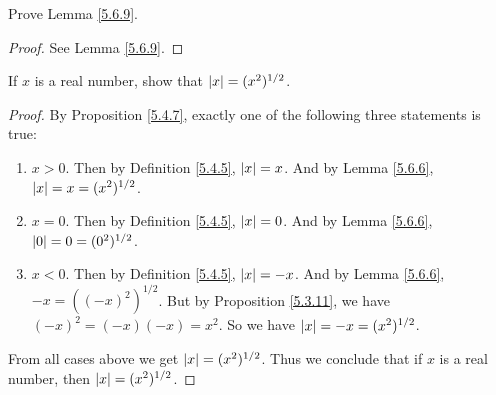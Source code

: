 \begin{exercise}\label{ex 5.6.2}
    Prove Lemma \ref{5.6.9}.
\end{exercise}

\begin{proof}
    See Lemma \ref{5.6.9}.
\end{proof}

\begin{exercise}\label{ex 5.6.3}
    If \(x\) is a real number, show that \(\abs*{x} = (x^2)^{1 / 2}\).
\end{exercise}

\begin{proof}
    By Proposition \ref{5.4.7}, exactly one of the following three statements is true:
    \begin{enumerate}
        \item \(x > 0\).
              Then by Definition \ref{5.4.5}, \(\abs*{x} = x\).
              And by Lemma \ref{5.6.6}, \(\abs*{x} = x = (x^2)^{1 / 2}\).
        \item \(x = 0\).
              Then by Definition \ref{5.4.5}, \(\abs*{x} = 0\).
              And by Lemma \ref{5.6.6}, \(\abs*{0} = 0 = (0^2)^{1 / 2}\).
        \item \(x < 0\).
              Then by Definition \ref{5.4.5}, \(\abs*{x} = -x\).
              And by Lemma \ref{5.6.6}, \(-x = ((-x)^2)^{1 / 2}\).
              But by Proposition \ref{5.3.11}, we have \((-x)^2 = (-x)(-x) = x^2\).
              So we have \(\abs*{x} = -x = (x^2)^{1 / 2}\).
    \end{enumerate}
    From all cases above we get \(\abs*{x} = (x^2)^{1 / 2}\).
    Thus we conclude that if \(x\) is a real number, then \(\abs*{x} = (x^2)^{1 / 2}\).
\end{proof}